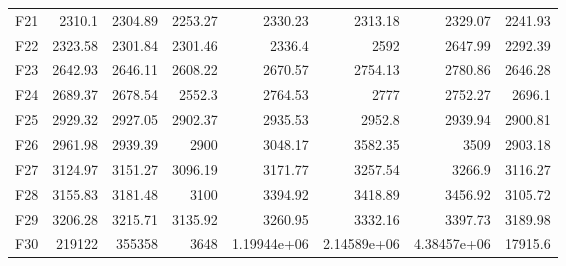 \documentclass[a4paper,fleqn]{cas-sc}
\begin{document}
\begin{table}[H]
{\begin{tabular}{lrrrrrrr}
F21 & 2310.1 & 2304.89 & 2253.27 & 2330.23 & 2313.18 & 2329.07 & 2241.93\\
F22 & 2323.58 & 2301.84 & 2301.46 & 2336.4 & 2592 & 2647.99 & 2292.39\\
F23 & 2642.93 & 2646.11 & 2608.22 & 2670.57 & 2754.13 & 2780.86 & 2646.28\\
F24 & 2689.37 & 2678.54 & 2552.3 & 2764.53 & 2777 & 2752.27 & 2696.1\\
F25 & 2929.32 & 2927.05 & 2902.37 & 2935.53 & 2952.8 & 2939.94 & 2900.81\\
F26 & 2961.98 & 2939.39 & 2900 & 3048.17 & 3582.35 & 3509 & 2903.18\\
F27 & 3124.97 & 3151.27 & 3096.19 & 3171.77 & 3257.54 & 3266.9 & 3116.27\\
F28 & 3155.83 & 3181.48 & 3100 & 3394.92 & 3418.89 & 3456.92 & 3105.72\\
F29 & 3206.28 & 3215.71 & 3135.92 & 3260.95 & 3332.16 & 3397.73 & 3189.98\\
F30 & 219122 & 355358 & 3648 & 1.19944e+06 & 2.14589e+06 & 4.38457e+06 & 17915.6\\
\bottomrule
\end{tabular}}
\end{table}
\end{document}
